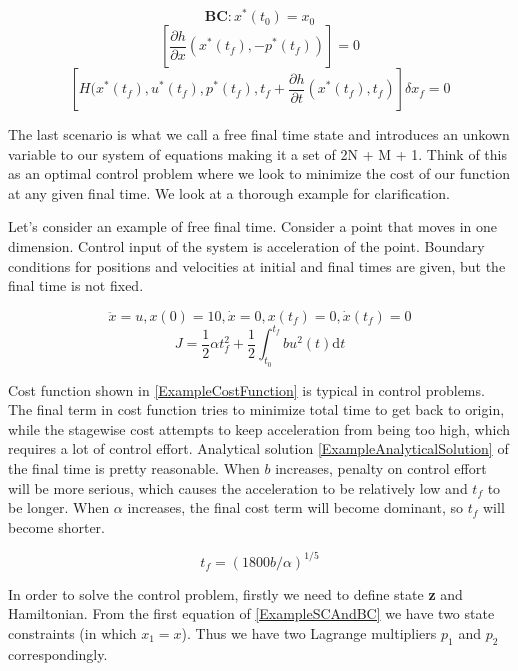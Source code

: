 \documentclass[twoside]{article}
\begin{document}
$$\textbf{BC}: x^*(t_0) = x_0$$
$$[\frac{\partial{h}}{\partial{x}}(x^*(t_f), - p^*(t_f))] = 0$$
$$[H(x^*(t_f), u^*(t_f), p^*(t_f), t_f + \frac{\partial{h}}{\partial{t}}(x^*(t_f), t_f)]\delta{x_f} = 0$$

The last scenario is what we call a free final time state and introduces an unkown variable to our system of equations making it a set of 2N + M + 1. Think of this as an optimal control problem where we look to minimize the cost of our function at any given final time. We look at a thorough example for clarification.

Let's consider an example of free final time. Consider a point that moves in one dimension. Control input of the system is acceleration of the point. Boundary conditions for positions and velocities at initial and final times are given, but the final time is not fixed.

\begin{equation}\label{ExampleSCAndBC}%
\ddot{x} = u, x(0) = 10, \dot{x} = 0, x(t_f) = 0, \dot{x}(t_f) = 0
\end{equation}
\begin{equation}\label{ExampleCostFunction}
J = \frac{1}{2}\alpha t_f^2 + \frac{1}{2} \int_{t_0}^{t_f} bu^2(t) \mathrm{d}t
\end{equation}

Cost function shown in \eqref{ExampleCostFunction} is typical in control problems. The final term in cost function tries to minimize total time to get back to origin, while the stagewise cost attempts to keep acceleration from being too high, which requires a lot of control effort. Analytical solution \eqref{ExampleAnalyticalSolution} of the final time is pretty reasonable. When $b$ increases, penalty on control effort will be more serious, which causes the acceleration to be relatively low and $t_f$ to be longer. When $\alpha$ increases, the final cost term will become dominant, so $t_f$ will become shorter.

\begin{equation}\label{ExampleAnalyticalSolution}
t_f = (1800b/\alpha)^{1/5}
\end{equation}

In order to solve the control problem, firstly we need to define state \textbf{z} and Hamiltonian. From the first equation of \eqref{ExampleSCAndBC} we have two state constraints (in which $x_1 = x$). Thus we have two Lagrange multipliers $p_1$ and $p_2$ correspondingly.
\end{document}
